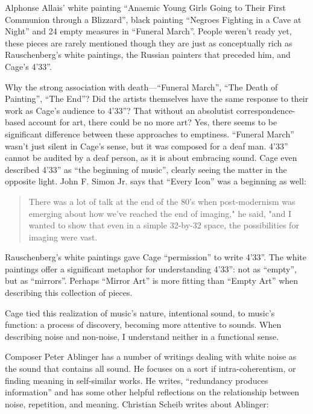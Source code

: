\documentclass{thesis}
\begin{document}
	Alphonse Allais' white painting ``Anaemic Young Girls Going to Their First Communion through a Blizzard'', black painting ``Negroes Fighting in a Cave at Night'' and 24 empty measures in ``Funeral March''. People weren't ready yet, these pieces are rarely mentioned though they are just as conceptually rich as Rauschenberg's white paintings, the Russian painters that preceded him, and Cage's 4'33''.
	
	Why the strong association with death---``Funeral March'', ``The Death of Painting'', ``The End''? Did the artists themselves have the same response to their work as Cage's audience to 4'33''? That without an absolutist correspondence-based account for art, there could be no more art? Yes, there seems to be significant difference between these approaches to emptiness. ``Funeral March'' wasn't just silent in Cage's sense, but it was composed for a deaf man. 4'33'' cannot be audited by a deaf person, as it is about embracing sound. Cage even described 4'33'' as ``the beginning of music'', clearly seeing the matter in the opposite light. John F. Simon Jr. says that ``Every Icon'' was a beginning as well:
	
	\begin{quote}
	There was a lot of talk at the end of the 80's when post-modernism was emerging about how we've reached the end of imaging," he said, "and I wanted to show that even in a simple 32-by-32 space, the possibilities for imaging were vast.\cite{matthew_mirapaul_in_1997}
	\end{quote}
	
	Rauschenberg's white paintings gave Cage ``permission'' to write 4'33''. The white paintings offer a significant metaphor for understanding 4'33'': not as ``empty'', but as ``mirrors''. Perhaps ``Mirror Art'' is more fitting than ``Empty Art'' when describing this collection of pieces.
	
	Cage tied this realization of music's nature, intentional sound, to music's function: a process of discovery, becoming more attentive to sounds. When describing noise and non-noise, I understand neither in a functional sense.
		
	Composer Peter Ablinger has a number of writings dealing with white noise as the sound that contains all sound. He focuses on a sort if intra-coherentism, or finding meaning in self-similar works. He writes, ``redundancy produces information''\cite{christian_scheib_statics_????} and has some other helpful reflections on the relationship between noise, repetition, and meaning. Christian Scheib writes about Ablinger:
	
\end{document}
